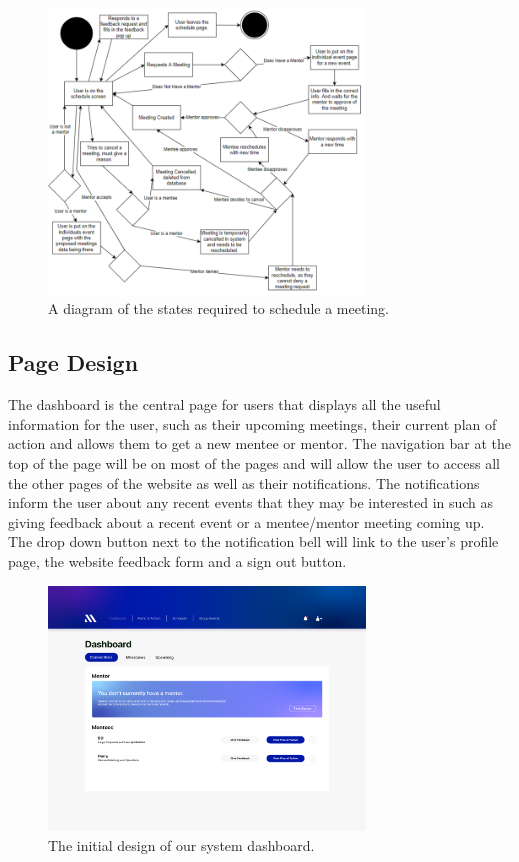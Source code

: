 \documentclass[10pt]{article}
\begin{document}
\begin{figure}[H]
    \centering
    \includegraphics[width=0.75\textwidth]{Meeting}
    \caption{A diagram of the states required to schedule a meeting.}
    \label{fig:state_meeting_diagram}
\end{figure}

\subsection{Page Design}
The dashboard is the central page for users that displays all the useful
information for the user, such as their upcoming meetings, their current plan of
action and allows them to get a new mentee or mentor. The navigation bar at the
top of the page will be on most of the pages and will allow the user to access
all the other pages of the website as well as their notifications. The
notifications inform the user about any recent events that they may be
interested in such as giving feedback about a recent event or a mentee/mentor
meeting coming up. The drop down button next to the notification bell will link
to the user's profile page, the website feedback form and a sign out button.

\begin{figure}[H]
    \centering
    \includegraphics[width=0.75\textwidth]{Dashboard}
    \caption{The initial design of our system dashboard.}
    \label{fig:dashboard_design}
\end{figure}
\end{document}
